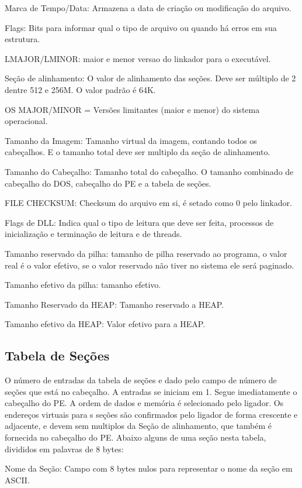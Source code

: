 Marca de Tempo/Data: Armazena a data de criação ou modificação do
arquivo.


Flags: Bits para informar qual o tipo de arquivo ou quando há erros
em sua estrutura.


LMAJOR/LMINOR: maior e menor versao do linkador para o executável.


Seção de alinhamento: O valor de alinhamento das seções. Deve ser
múltiplo de 2 dentre 512 e 256M. O valor padrão é 64K.


OS MAJOR/MINOR = Versões limitantes (maior e menor) do sistema operacional.


Tamanho da Imagem: Tamanho virtual da imagem, contando todos os cabeçalhos.
E o tamanho total deve ser multiplo da seção de alinhamento.


Tamanho do Cabeçalho: Tamanho total do cabeçalho. O tamanho combinado
de cabeçalho do DOS, cabeçalho do PE e a tabela de seções.


FILE CHECKSUM: Checksum do arquivo em si, é setado como 0 pelo linkador.


Flags de DLL: Indica qual o tipo de leitura que deve ser feita, processos
de inicialização e terminação de leitura e de threads.


Tamanho reservado da pilha: tamanho de pilha reservado ao programa,
o valor real é o valor efetivo, se o valor reservado não tiver no
sistema ele será paginado.


Tamanho efetivo da pilha: tamanho efetivo.


Tamanho Reservado da HEAP: Tamanho reservado a HEAP.


Tamanho efetivo da HEAP: Valor efetivo para a HEAP.


\subsection{Tabela de Seções}


O número de entradas da tabela de seções e dado pelo campo de número
de seções que está no cabeçalho. A entradas se iniciam em 1. Segue
imediatamente o cabeçalho do PE. A ordem de dados e memória é selecionado
pelo ligador. Os endereços virtuais para s seções são confirmados
pelo ligador de forma crescente e adjacente, e devem sem multiplos
da Seção de alinhamento, que também é fornecida no cabeçalho do PE.
Abaixo alguns de uma seção nesta tabela, divididos em palavras de
8 bytes:


Nome da Seção: Campo com 8 bytes nulos para representar o nome da
seção em ASCII.


